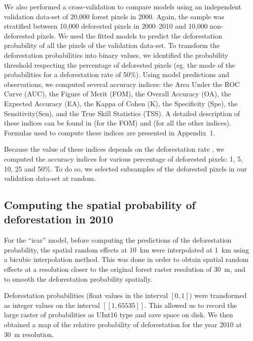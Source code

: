 \documentclass[12pt,]{article}
\begin{document}
We also performed a cross-validation to compare models using an independent validation data-set of 20,000 forest pixels in 2000. Again, the sample was stratified between 10,000 deforested pixels in 2000--2010 and 10,000 non-deforested pixels. We used the fitted models to predict the deforestation probability of all the pixels of the validation data-set. To transform the deforestation probabilities into binary values, we identified the probability threshold respecting the percentage of deforested pixels (eg. the mode of the probabilities for a deforestation rate of 50\%). Using model predictions and observations, we computed several accuracy indices: the Area Under the ROC Curve (AUC), the Figure of Merit (FOM), the Overall Accuracy (OA), the Expected Accuracy (EA), the Kappa of Cohen (K), the Specificity (Spe), the Sensitivity(Sen), and the True Skill Statistics (TSS). A detailed description of these indices can be found in \citet{Pontius2008} (for the FOM) and \citet{Liu2011} (for all the other indices). Formulas used to compute these indices are presented in Appendix~1.

Because the value of these indices depends on the deforestation rate \citep{Pontius2008}, we computed the accuracy indices for various percentage of deforested pixels: 1, 5, 10, 25 and 50\%. To do so, we selected subsamples of the deforested pixels in our validation data-set at random.

\hypertarget{computing-the-spatial-probability-of-deforestation-in-2010}{%
\subsection{Computing the spatial probability of deforestation in 2010}\label{computing-the-spatial-probability-of-deforestation-in-2010}}

For the ``icar'' model, before computing the predictions of the deforestation probability, the spatial random effects at 10~km were interpolated at 1~km using a bicubic interpolation method. This was done in order to obtain spatial random effects at a resolution closer to the original forest raster resolution of 30~m, and to smooth the deforestation probability spatially.

Deforestation probabilities (float values in the interval \([0, 1]\)) were transformed as integer values on the interval \([\![1, 65535]\!]\). This allowed us to record the large raster of probabilities as UInt16 type and save space on disk. We then obtained a map of the relative probability of deforestation for the year 2010 at 30~m resolution.
\end{document}
